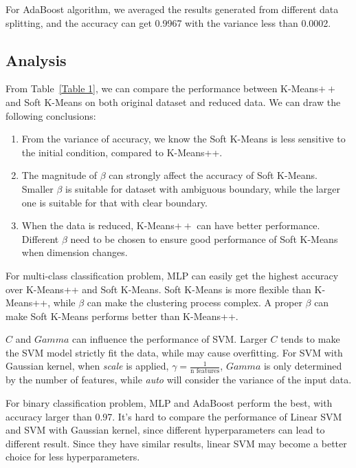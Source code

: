 \documentclass{article}
\begin{document}
For AdaBoost algorithm, we averaged the results generated from different data splitting, and the accuracy can get 0.9967 with the variance less than 0.0002.

\subsection{Analysis}
From Table~\ref{Table 1}, we can compare the performance between K-Means$++$ and Soft K-Means on both original dataset and reduced data. We can draw the following conclusions:
\begin{enumerate}
    \item From the variance of accuracy, we know the Soft K-Means is less sensitive to the initial condition, compared to K-Means++.
    \item The magnitude of $\beta$ can strongly affect the accuracy of Soft K-Means. Smaller $\beta$ is suitable for dataset with ambiguous boundary, while the larger one is suitable for that with clear boundary.
    \item When the data is reduced, K-Means$++$ can have better performance. Different $\beta$ need to be chosen to ensure good performance of Soft K-Means when dimension changes.
\end{enumerate}

For multi-class classification problem, MLP can easily get the highest accuracy over K-Means++ and Soft K-Means. Soft K-Means is more flexible than K-Means++, while $\beta$ can make the clustering process complex. A proper $\beta$ can make Soft K-Means performs better than K-Means++.

$C$ and $Gamma$ can influence the performance of SVM. Larger $C$ tends to make the SVM model strictly fit the data, while may cause overfitting. For SVM with Gaussian kernel, 
when \textit{scale} is applied, $\gamma =\frac{1}{\text{n features}}$, $Gamma$ is only determined by the number of features, while \textit{auto} will consider the variance of the input data.

For binary classification problem, MLP and AdaBoost perform the best, with accuracy larger than 0.97. It's hard to compare the performance of Linear SVM and SVM with Gaussian kernel, since different hyperparameters can lead to different result. Since they have similar results, linear SVM may become a better choice for less hyperparameters.
\end{document}
